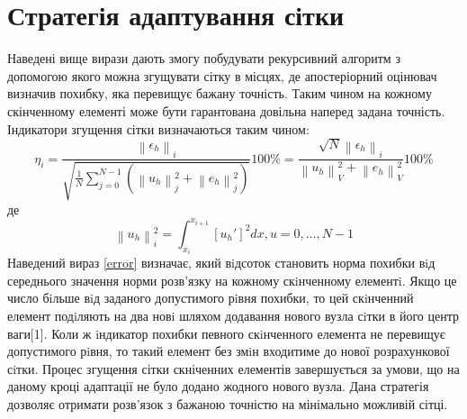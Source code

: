 \documentclass[a4paper]{article}
\newcommand\norm[1]{\left\lVert#1\right\rVert}
\numberwithin{equation}{section}
\begin{document}
\section{Стратегія адаптування сітки}
Наведені вище вирази дають змогу побудувати рекурсивний алгоритм з допомогою якого можна згущувати сітку в місцях, де апостеріорний оцінювач визначив похибку, яка перевищує бажану точність. Таким чином на кожному скінченному елементі може бути гарантована довільна наперед задана точність. Індикатори згущення сітки визначаються таким чином:
\begin{equation}\label{error}
\eta_i=\frac{\norm{\epsilon_h}_i}{\sqrt{ \frac{1}{N} \sum_{j=0}^{N-1}(\norm{u_h}_j^2 + \norm{e_h}_j^2)}}100\%=\frac{\sqrt{N}\norm{\epsilon_h}_i} {\norm{u_h}_V^2 + \norm{e_h}_V^2} 100\%
\end{equation}
де
\begin{equation}
\norm{u_h}_i^2=\int_{x_i}^{x_{i+1}}[u_h']^2dx, u=0,\ldots, N-1
\end{equation}
Наведений вираз \ref{error} визначає, який вiдсоток становить норма похибки вiд середнього значення норми розв’язку на кожному скiнченному елементi. Якщо це число бiльше вiд заданого допустимого рiвня похибки, то цей скiнченний елемент подiляють на два новi шляхом додавання нового вузла сiтки в його центр ваги[1]. Коли ж iндикатор похибки певного скiнченного елемента не перевищує допустимого рiвня, то такий елемент без змiн входитиме до нової розрахункової сiтки. Процес згущення сітки скніченних елементів завершується за умови, що на даному кроці адаптації не було додано жодного нового вузла.
Дана стратегія дозволяє отримати розв'язок з бажаною точністю на мінімально можливій сітці.
\end{document}

